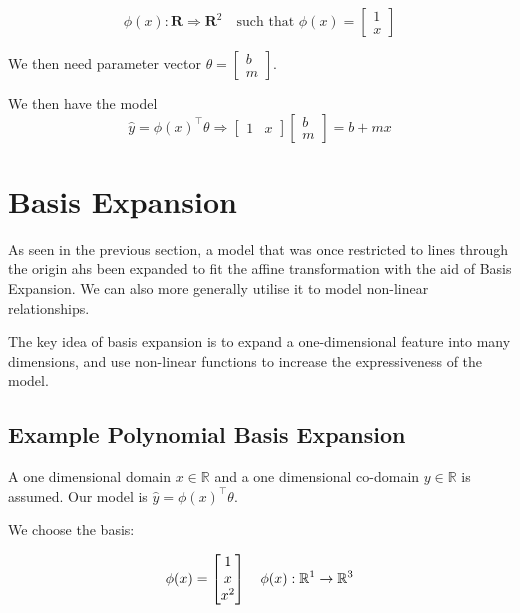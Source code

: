 \begin{equation}
    \phi(x) : \mathbf{R} \Rightarrow \mathbf{R}^2 \quad \text{such that } \phi(x) = \begin{bmatrix} 1 \\ x \end{bmatrix} 
\end{equation}

\noindent We then need parameter vector $\theta = \begin{bmatrix} b \\ m \end{bmatrix}$. 

\noindent We then have the model 
\begin{equation}
    \hat{y} = \phi(x)^\top \theta \Rightarrow \begin{bmatrix} 1 & x \end{bmatrix}  \begin{bmatrix} b \\ m \end{bmatrix} = b + mx
\end{equation}

\section{Basis Expansion}
As seen in the previous section, a model that was once restricted to lines through the origin ahs been expanded to fit the affine transformation with the aid of Basis Expansion. We can also more generally utilise it to model non-linear relationships.

\bigskip

The key idea of basis expansion is to expand a one-dimensional feature into many dimensions, and use non-linear functions to increase the expressiveness of the model.

\subsection{Example Polynomial Basis Expansion}
A one dimensional domain $x \in \mathbb{R}$ and a one dimensional co-domain $y \in \mathbb{R}$ is assumed. Our model is $\hat{y} = \phi(x)^\top \theta$. \bigskip


We choose the basis:

\begin{equation}
    \phi(x) = \begin{bmatrix} 1 \\ x \\ x^2 \end{bmatrix} \quad \phi(x) : \mathbb{R}^1 \rightarrow \mathbb{R}^3
\end{equation}

